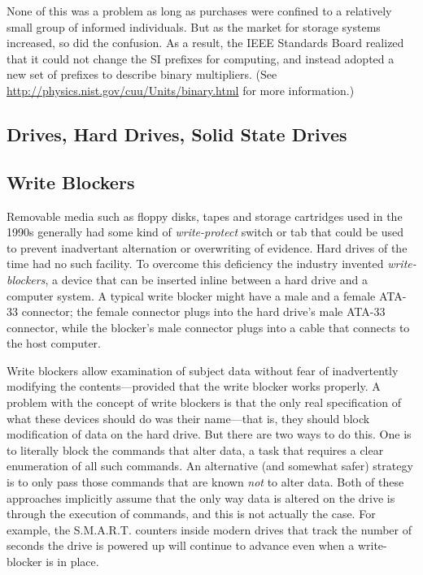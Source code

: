 None of this was a problem as long as purchases were confined to a
relatively small group of informed individuals. But as the market for
storage systems increased, so did the confusion. As a result, the IEEE
Standards Board realized that it could not change the SI prefixes for
computing, and instead adopted a new set of prefixes to describe
binary multipliers. (See
\url{http://physics.nist.gov/cuu/Units/binary.html} for more information.)

\subsection{Drives, Hard Drives, Solid State Drives}

\subsection{Write Blockers}

Removable media such as floppy disks, tapes and storage cartridges
used in the 1990s generally had some kind of \emph{write-protect}
switch or tab that could be used to prevent inadvertant alternation or
overwriting of evidence. Hard drives of the time had no such
facility. To overcome this deficiency the industry invented
\emph{write-blockers}, a device that can be inserted inline between a
hard drive and a computer system. A typical write blocker might have a
male and a female ATA-33 connector; the female connector plugs into
the hard drive's male ATA-33 connector, while the blocker's male
connector plugs into a cable that connects to the host computer.

Write blockers allow examination of subject data without fear of
inadvertently modifying the contents---provided that the write blocker
works properly. A problem with the concept of write blockers is that
the only real specification of what these devices should do was their
name---that is, they should block modification of data on the hard
drive.  But there
are two ways to do this. One is to literally block the commands that
alter data, a task that requires a clear enumeration of all such
commands. An alternative (and somewhat safer) strategy is to only pass
those commands that are known \emph{not} to alter
data\cite{dfrws2006:JamesLyle}. Both of these approaches
implicitly assume that the only way data is altered on the drive is
through the execution of commands, and this is not actually the
case. For example, the S.M.A.R.T. counters inside modern drives that
track the number of seconds the drive is powered up will continue to
advance even when a write-blocker is in place.

